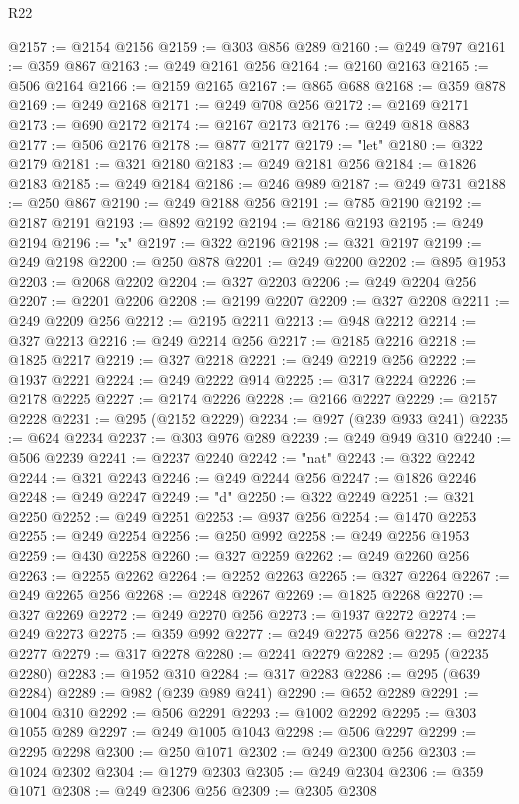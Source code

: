 \begin{lexlean}{R22}
\begin{coremodule}
@2157 := @2154 @2156
@2159 := @303 @856 @289
@2160 := @249 @797
@2161 := @359 @867
@2163 := @249 @2161 @256
@2164 := @2160 @2163
@2165 := @506 @2164
@2166 := @2159 @2165
@2167 := @865 @688
@2168 := @359 @878
@2169 := @249 @2168
@2171 := @249 @708 @256
@2172 := @2169 @2171
@2173 := @690 @2172
@2174 := @2167 @2173
@2176 := @249 @818 @883
@2177 := @506 @2176
@2178 := @877 @2177
@2179 := "let"
@2180 := @322 @2179
@2181 := @321 @2180
@2183 := @249 @2181 @256
@2184 := @1826 @2183
@2185 := @249 @2184
@2186 := @246 @989
@2187 := @249 @731
@2188 := @250 @867
@2190 := @249 @2188 @256
@2191 := @785 @2190
@2192 := @2187 @2191
@2193 := @892 @2192
@2194 := @2186 @2193
@2195 := @249 @2194
@2196 := "x"
@2197 := @322 @2196
@2198 := @321 @2197
@2199 := @249 @2198
@2200 := @250 @878
@2201 := @249 @2200
@2202 := @895 @1953
@2203 := @2068 @2202
@2204 := @327 @2203
@2206 := @249 @2204 @256
@2207 := @2201 @2206
@2208 := @2199 @2207
@2209 := @327 @2208
@2211 := @249 @2209 @256
@2212 := @2195 @2211
@2213 := @948 @2212
@2214 := @327 @2213
@2216 := @249 @2214 @256
@2217 := @2185 @2216
@2218 := @1825 @2217
@2219 := @327 @2218
@2221 := @249 @2219 @256
@2222 := @1937 @2221
@2224 := @249 @2222 @914
@2225 := @317 @2224
@2226 := @2178 @2225
@2227 := @2174 @2226
@2228 := @2166 @2227
@2229 := @2157 @2228
@2231 := @295 (@2152 @2229)
@2234 := @927 (@239 @933 @241)
@2235 := @624 @2234
@2237 := @303 @976 @289
@2239 := @249 @949 @310
@2240 := @506 @2239
@2241 := @2237 @2240
@2242 := "nat"
@2243 := @322 @2242
@2244 := @321 @2243
@2246 := @249 @2244 @256
@2247 := @1826 @2246
@2248 := @249 @2247
@2249 := "d"
@2250 := @322 @2249
@2251 := @321 @2250
@2252 := @249 @2251
@2253 := @937 @256
@2254 := @1470 @2253
@2255 := @249 @2254
@2256 := @250 @992
@2258 := @249 @2256 @1953
@2259 := @430 @2258
@2260 := @327 @2259
@2262 := @249 @2260 @256
@2263 := @2255 @2262
@2264 := @2252 @2263
@2265 := @327 @2264
@2267 := @249 @2265 @256
@2268 := @2248 @2267
@2269 := @1825 @2268
@2270 := @327 @2269
@2272 := @249 @2270 @256
@2273 := @1937 @2272
@2274 := @249 @2273
@2275 := @359 @992
@2277 := @249 @2275 @256
@2278 := @2274 @2277
@2279 := @317 @2278
@2280 := @2241 @2279
@2282 := @295 (@2235 @2280)
@2283 := @1952 @310
@2284 := @317 @2283
@2286 := @295 (@639 @2284)
@2289 := @982 (@239 @989 @241)
@2290 := @652 @2289
@2291 := @1004 @310
@2292 := @506 @2291
@2293 := @1002 @2292
@2295 := @303 @1055 @289
@2297 := @249 @1005 @1043
@2298 := @506 @2297
@2299 := @2295 @2298
@2300 := @250 @1071
@2302 := @249 @2300 @256
@2303 := @1024 @2302
@2304 := @1279 @2303
@2305 := @249 @2304
@2306 := @359 @1071
@2308 := @249 @2306 @256
@2309 := @2305 @2308

\end{coremodule}
\end{lexlean}
